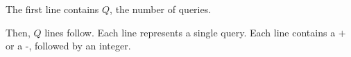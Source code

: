 \documentclass{article}
\begin{document}
The first line contains $Q$, the number of queries.

Then, $Q$ lines follow. Each line represents a single query. Each line contains a $\textbf{+}$ or a $\textbf{-}$, followed by an integer. 
\end{document}
